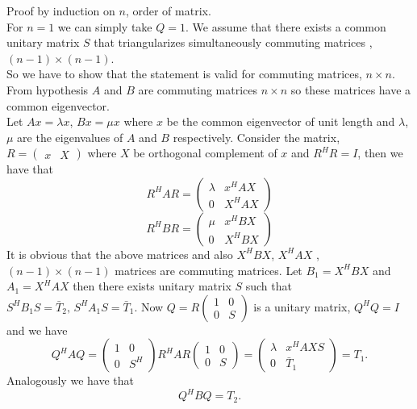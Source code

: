 \documentclass[12pt]{article}
\begin{document}
Proof by induction on $n$, order of matrix.
\\For $n=1$ we can simply take $Q=1$.
We assume that there exists a common unitary matrix $S$ that triangularizes simultaneously commuting matrices ,$(n-1)\times (n-1)$.\\So we have to show that the statement is valid for commuting matrices, $n\times n$.
From hypothesis $A$ and $B$ are commuting matrices $n\times n$ so these matrices have a common eigenvector.\\Let
$Ax=\lambda x$,  $Bx=\mu x$ where $x$ be the common eigenvector of unit length and $\lambda$, $\mu$ are the eigenvalues of $A$ and $B$ respectively. Consider the matrix, $R=\begin{pmatrix} x & X \end{pmatrix}$ 
where $X$ be orthogonal complement of $x$ and $R^HR=I$, then we have that 
$$R^HAR = \begin{pmatrix} \lambda & x^HAX \\ 0 & X^HAX \end{pmatrix}$$
$$R^HBR = \begin{pmatrix} \mu & x^HBX \\ 0 & X^HBX \end{pmatrix}$$
It is obvious that the above matrices and also 
$X^HBX$, $X^HAX$ ,$(n-1)\times(n-1)$ matrices are commuting matrices. Let $B_1=X^HBX$ and $A_1=X^HAX$ then 
there exists unitary matrix $S$ such that $S^HB_1S=\bar T_2,\, S^HA_1S=\bar T_1.$ Now $Q=R\begin{pmatrix} 1 & 0 \\ 0 & S \end{pmatrix}$ is a unitary matrix,
$Q^HQ=I$ and we have 
$$Q^HAQ=\begin{pmatrix} 1 & 0 \\ 0 & S^H \end{pmatrix}R^HAR\begin{pmatrix} 1 & 0 \\ 0 & S \end{pmatrix}=\begin{pmatrix} \lambda & x^HAXS \\ 0 & \bar T_1 \end{pmatrix}=T_1.$$
Analogously we have that $$Q^HBQ=T_2.$$
\end{document}
